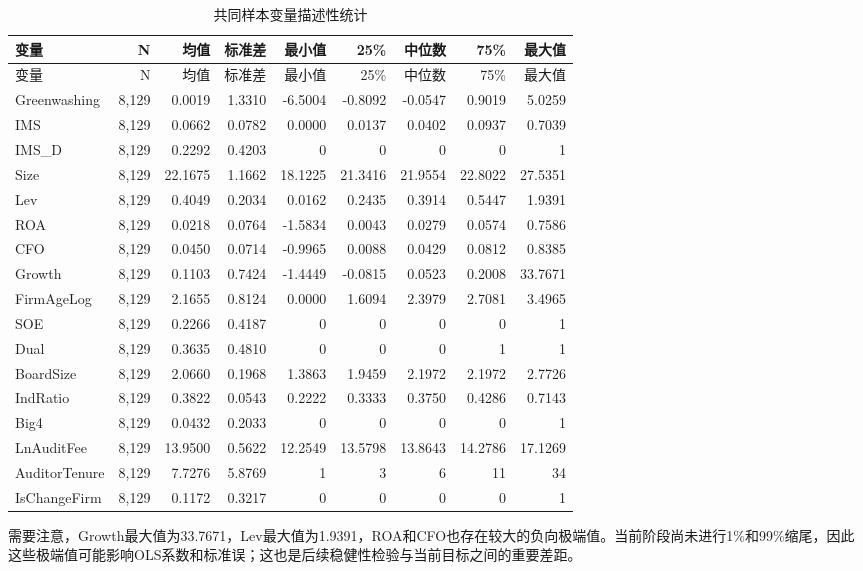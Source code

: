 \documentclass[UTF8,12pt,a4paper]{ctexart}
\begin{document}
\begin{landscape}
\begin{longtable}{lrrrrrrrr}
\caption{共同样本变量描述性统计}\label{tab:desc}\\
\toprule
变量 & N & 均值 & 标准差 & 最小值 & 25\% & 中位数 & 75\% & 最大值\\
\midrule
\endfirsthead
\toprule
变量 & N & 均值 & 标准差 & 最小值 & 25\% & 中位数 & 75\% & 最大值\\
\midrule
\endhead
Greenwashing & 8,129 & 0.0019 & 1.3310 & -6.5004 & -0.8092 & -0.0547 & 0.9019 & 5.0259\\
IMS & 8,129 & 0.0662 & 0.0782 & 0.0000 & 0.0137 & 0.0402 & 0.0937 & 0.7039\\
IMS\_D & 8,129 & 0.2292 & 0.4203 & 0 & 0 & 0 & 0 & 1\\
Size & 8,129 & 22.1675 & 1.1662 & 18.1225 & 21.3416 & 21.9554 & 22.8022 & 27.5351\\
Lev & 8,129 & 0.4049 & 0.2034 & 0.0162 & 0.2435 & 0.3914 & 0.5447 & 1.9391\\
ROA & 8,129 & 0.0218 & 0.0764 & -1.5834 & 0.0043 & 0.0279 & 0.0574 & 0.7586\\
CFO & 8,129 & 0.0450 & 0.0714 & -0.9965 & 0.0088 & 0.0429 & 0.0812 & 0.8385\\
Growth & 8,129 & 0.1103 & 0.7424 & -1.4449 & -0.0815 & 0.0523 & 0.2008 & 33.7671\\
FirmAgeLog & 8,129 & 2.1655 & 0.8124 & 0.0000 & 1.6094 & 2.3979 & 2.7081 & 3.4965\\
SOE & 8,129 & 0.2266 & 0.4187 & 0 & 0 & 0 & 0 & 1\\
Dual & 8,129 & 0.3635 & 0.4810 & 0 & 0 & 0 & 1 & 1\\
BoardSize & 8,129 & 2.0660 & 0.1968 & 1.3863 & 1.9459 & 2.1972 & 2.1972 & 2.7726\\
IndRatio & 8,129 & 0.3822 & 0.0543 & 0.2222 & 0.3333 & 0.3750 & 0.4286 & 0.7143\\
Big4 & 8,129 & 0.0432 & 0.2033 & 0 & 0 & 0 & 0 & 1\\
LnAuditFee & 8,129 & 13.9500 & 0.5622 & 12.2549 & 13.5798 & 13.8643 & 14.2786 & 17.1269\\
AuditorTenure & 8,129 & 7.7276 & 5.8769 & 1 & 3 & 6 & 11 & 34\\
IsChangeFirm & 8,129 & 0.1172 & 0.3217 & 0 & 0 & 0 & 0 & 1\\
\bottomrule
\end{longtable}
\end{landscape}

需要注意，Growth最大值为33.7671，Lev最大值为1.9391，ROA和CFO也存在较大的负向极端值。当前阶段尚未进行1\%和99\%缩尾，因此这些极端值可能影响OLS系数和标准误；这也是后续稳健性检验与当前目标之间的重要差距。
\end{document}
